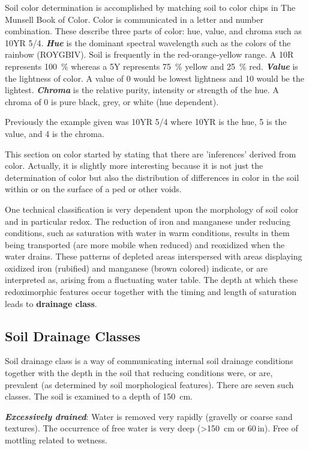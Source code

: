 \documentclass[letterpaper, 12pt]{article}
\begin{document}
Soil color determination is accomplished by matching soil to color chips in The Munsell Book of Color. Color is communicated in a letter and number combination. These describe three parts of color: hue, value, and chroma such as 10YR 5/4. \textbf{\textit{Hue}} is the dominant spectral wavelength such as the colors of the rainbow (ROYGBIV). Soil is frequently in the red-orange-yellow range. A 10R represents \qty{100}{\percent} whereas a 5Y represents \qty{75}{\percent} yellow and \qty{25}{\percent} red. \textbf{\textit{Value}} is the lightness of color. A value of 0 would be lowest lightness and 10 would be the lightest. \textbf{\textit{Chroma}} is the relative purity, intensity or strength of the hue. A chroma of 0 is pure black, grey, or white (hue dependent).

Previously the example given was 10YR 5/4 where 10YR is the hue, 5 is the value, and 4 is the chroma.
    
This section on color started by stating that there are 'inferences' derived from color. Actually, it is slightly more interesting because it is not just the determination of color but also the distribution of differences in color in the soil  within or on the surface of a ped or other voids.
 
One technical classification is very dependent upon the morphology of soil color and in particular redox. The reduction of iron and manganese under reducing conditions, such as saturation with water in warm conditions, results in them being  transported (are more mobile when reduced) and reoxidized when the water drains. These patterns of depleted areas interspersed with areas displaying oxidized iron (rubified) and manganese (brown colored) indicate, or are interpreted as, arising from a fluctuating water table. The depth at which these redoximorphic features occur together with the timing and length of saturation leads to \textbf{drainage class}.
 
\subsection{Soil Drainage Classes}
\label{drainageclasses}

Soil drainage class is a way of communicating internal soil drainage conditions together with the depth in the soil that reducing conditions were, or are, prevalent (as determined by soil morphological features). There are seven such classes. The soil is examined to a depth of \qty{150}{cm}.

\textbf{\textit{Excessively drained}}: Water is removed very rapidly (gravelly or coarse sand textures). The occurrence of free water is very deep (\textgreater{}\qty{150}{cm} or 60\,in). Free of mottling related to wetness.
\end{document}
